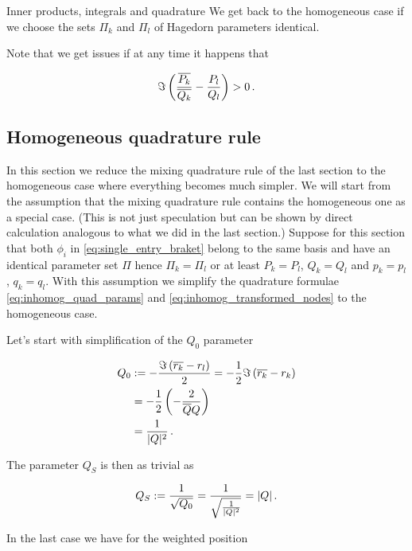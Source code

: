 \begin{chapter}{Inner products, integrals and quadrature}
We get back to the homogeneous case if we choose the sets $\Pi_k$ and
$\Pi_l$ of Hagedorn parameters identical.

Note that we get issues if at any time it happens that

\begin{equation}
  \Im \left(\frac{\overline{P_k}}{\overline{Q_k}} -\frac{P_l}{Q_l}\right) > 0 \,.
\end{equation}


\subsection{Homogeneous quadrature rule}

In this section we reduce the mixing quadrature rule of the last section to the
homogeneous case where everything becomes much simpler.
We will start from the assumption that the mixing quadrature rule contains the
homogeneous one as a special case. (This is not just speculation but can be shown
by direct calculation analogous to what we did in the last section.) Suppose for
this section that both $\phi_i$ in \eqref{eq:single_entry_braket} belong to the
same basis and have an identical parameter set $\Pi$ hence $\Pi_k = \Pi_l$ or at
least $P_k = P_l$, $Q_k = Q_l$ and $p_k = p_l$, $q_k = q_l$. With this assumption
we simplify the quadrature formulae \eqref{eq:inhomog_quad_params} and
\eqref{eq:inhomog_transformed_nodes} to the homogeneous case.

Let's start with simplification of the $Q_0$ parameter

\begin{equation}
\begin{split}
  Q_0 & := -\frac{\Im \left(\overline{r_k}-r_l\right)}{2}
        = -\frac{1}{2} \Im \left(\overline{r_k}-r_k\right) \\
      & = - \frac{1}{2} \left( - \frac{2}{\overline{Q}Q}\right) \\
      & = \frac{1}{|Q|^2} \,.
\end{split}
\end{equation}

The parameter $Q_S$ is then as trivial as

\begin{equation}
  Q_S := \frac{1}{\sqrt{Q_0}} = \frac{1}{\sqrt{\frac{1}{|Q|^2}}} = |Q| \,.
\end{equation}

In the last case we have for the weighted position


\end{chapter}
